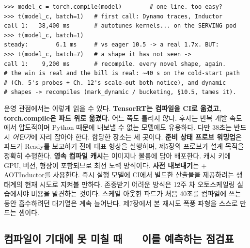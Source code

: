 \begin{terminalbox}
\begin{Verbatim}[breaklines=true,breakanywhere=true,fontsize=\small,formatcom=\color{tbbtermfg},codes=\tbbcodeactive]
>>> model_c = torch.compile(model)        # one line. too easy?
>>> t(model_c, batch=1)   # first call: Dynamo traces, Inductor
call 1:   38,400 ms       # autotunes kernels... on the SERVING pod
>>> t(model_c, batch=1)
steady:        6.1 ms     # vs eager 10.5 -> a real 1.7x. BUT:
>>> t(model_c, batch=7)   # a shape it has not seen ->
call 1:    9,200 ms       # recompile. every novel shape, again.
# the win is real and the bill is real: ~40 s on the cold-start path
# (Ch. 5's probes + Ch. 12's scale-out both notice), and dynamic
# shapes -> recompiles (mark_dynamic / bucketing, §10.5, tames it).
\end{Verbatim}
\end{terminalbox}

운영 관점에서는 이렇게 읽을 수 있다. \textbf{TensorRT는 컴파일을 CI로 옮겼고, torch.compile은 파드 위로 옮겼다.} 어느 쪽도 틀리지 않다. 후자는 반복 개발 속도에서 압도적이며 Python 때문에 내보낼 수 없는 모델에도 유용하다. 다만 38초는 반드시 \textit{어딘가}에 자리 잡아야 한다. 합당한 장소는 세 곳이다. \textbf{준비 상태 프로브 워밍업}은 파드가 Ready를 보고하기 전에 대표 형상을 실행하며, 제5장의 프로브가 설계 목적을 정확히 수행한다. \textbf{영속 컴파일 캐시}는 이미지나 볼륨에 담아 배포한다. 캐시 키에 GPU, 버전, 형상이 포함되므로 최선 노력 방식이다. \textbf{사전 내보내기}는  + AOTInductor를 사용한다. 즉시 실행 모델에 CI에서 빌드한 산출물을 제공하려는 생태계의 현재 시도로 지켜볼 만하다. 존중받기 어려운 방식은 12주 차 오토스케일링 실습에서야 비용을 발견하는 것이다. 스케일 아웃한 파드가 처음 40초를 컴파일에 쓰는 동안 흡수하려던 대기열은 계속 늘어난다. 제7장에서 본 재시도 폭풍 파형을 스스로 만드는 셈이다.

\subsection*{컴파일이 기대에 못 미칠 때 — 이를 예측하는 점검표}

